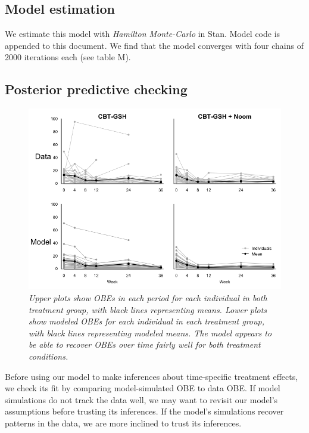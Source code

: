 \documentclass[12pt, oneside]{article}
\begin{document}
\subsection{Model estimation}
We estimate this model with \emph{Hamilton Monte-Carlo} in Stan.  Model code is appended to this document.  We find that the model converges with four chains of 2000 iterations each (see table M).  

\subsection{Posterior predictive checking}

\begin{figure}
\centering
\includegraphics[width=\textwidth, height=\textheight, keepaspectratio]{ppc_sims.png}
\caption{\emph{Upper plots show OBEs in each period for each individual in both treatment group, with black lines representing means.  Lower plots show modeled OBEs for each individual in each treatment group, with black lines representing modeled means.  The model appears to be able to recover OBEs over time fairly well for both treatment conditions.}}
\end{figure}

Before using our model to make inferences about time-specific treatment effects, we check its fit by comparing model-simulated OBE to data OBE.  If model simulations do not track the data well, we may want to revisit our model's assumptions before trusting its inferences.  If the model's simulations recover patterns in the data, we are more inclined to trust its inferences.  
\\
\end{document}
